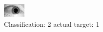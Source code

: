 \begin{figure}[h!]
\begin{center}
\includegraphics[width=0.60\columnwidth]{figures/ID1529_class_2_target_1.png}
\end{center}
\caption{ Classification: 2 actual target: 1}
\label{fig:ID1529_class_2_target_1}
\end{figure}
